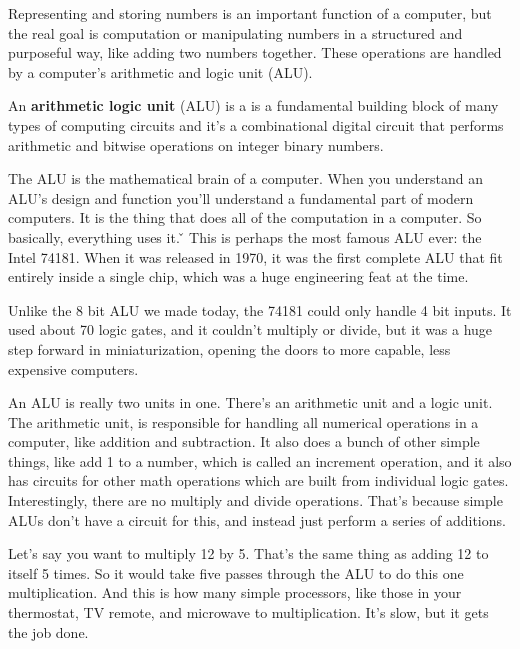 Representing and storing numbers is an important function of a computer, but the real goal is computation or
manipulating numbers in a structured and purposeful way, like adding two numbers together. These operations are
handled by a computer's arithmetic and logic unit (ALU).

An \textbf{arithmetic logic unit} (ALU) is a is a fundamental building block of many types of computing circuits and
it's a combinational digital circuit that performs arithmetic and bitwise operations on integer binary numbers.
\ed

The ALU is the mathematical brain of a computer. When you understand an ALU's design and function you'll understand a
fundamental part of modern computers. It is the thing that does all of the computation in a computer. So basically,
everything uses it. \v

\be
This is perhaps the most famous ALU ever: the Intel 74181. When it was released in 1970, it was the first complete
ALU that fit entirely inside a single chip, which was a huge engineering feat at the time.

\vspace{-10pt}


Unlike the 8 bit ALU we made today, the 74181 could only handle 4 bit inputs. It used about 70 logic gates, and it
couldn't multiply or divide, but it was a huge step forward in miniaturization, opening the doors to more capable,
less expensive computers.
\ee

An ALU is really two units in one. There's an arithmetic unit and a logic unit. The arithmetic unit, is responsible
for handling all numerical operations in a computer, like addition and subtraction. It also does a bunch of other
simple things, like add 1 to a number, which is called an increment operation, and it also has circuits for other
math operations which are built from individual logic gates. Interestingly, there are no multiply and divide
operations. That's because simple ALUs don't have a circuit for this, and instead just perform a series of additions.

\be
Let's say you want to multiply 12 by 5. That's the same thing as adding 12 to itself 5 times. So it would take five
passes through the ALU to do this one multiplication. And this is how many simple processors, like those in your
thermostat, TV remote, and microwave to multiplication. It's slow, but it gets the job done.
\ee

